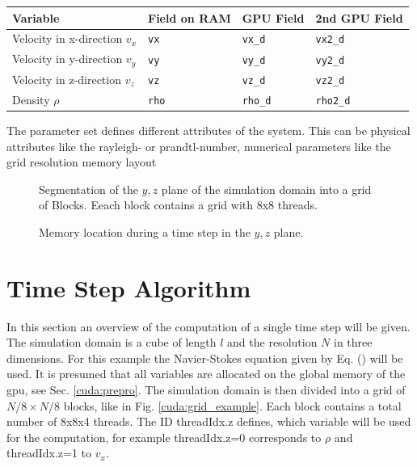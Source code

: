 \begin{center}
    \begin{tabular}{ | l | l | l | l |}
    \hline
    Variable & Field on RAM & GPU Field & 2nd GPU Field \\
    \hline
    Velocity in x-direction $v_x$  & \texttt{vx}   &  \texttt{vx\_d}   & \texttt{vx2\_d}   \\
    Velocity in y-direction $v_y$  & \texttt{vy}   &  \texttt{vy\_d}   & \texttt{vy2\_d}   \\
    Velocity in z-direction $v_z$  & \texttt{vz}   &  \texttt{vz\_d}   & \texttt{vz2\_d}   \\
    Density  $\rho$  & \texttt{rho}  &  \texttt{rho\_d}  & \texttt{rho2\_d}  \\
    \hline
    \end{tabular}
\end{center}
The parameter set defines different attributes of the system.
This can be physical attributes like the rayleigh- or prandtl-number, numerical parameters like the grid resolution
memory layout

\clearpage


\begin{figure}[!bp]
      \centering
       \caption{Segmentation of the $y, z$ plane of the simulation domain into a grid of Blocks.
                 Eeach block contains a grid with 8x8 threads.}
       \label{cuda:stencil}
\end{figure}

\begin{figure}[!bp]
      \centering
       \caption{
           Memory location during a time step in the $y, z$ plane.
           }
       \label{cuda:timestep_algo_img}
\end{figure}

\clearpage
\section{Time Step Algorithm}

In this section an overview of the computation of a single time step will be given.
The simulation domain is a cube of length $l$ and the resolution $N$ in three dimensions.
For this example the Navier-Stokes equation given by Eq. () will be used.
It is presumed that all variables are allocated on the global memory of the gpu, see Sec. \ref{cuda:prepro}.
The simulation domain is then divided into a grid of  $N/8 \times N/8$ blocks, like in Fig. \ref{cuda:grid_example}.
Each block contains a total number of 8x8x4 threads.
The ID threadIdx.z defines, which variable will be used for the computation, for example threadIdx.z=0 corresponds to $\rho$ and threadIdx.z=1 to $v_x$.

